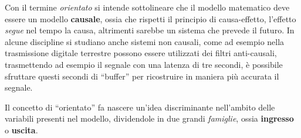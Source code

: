Con il termine \textit{orientato} si intende sottolineare che il modello matematico deve essere un
modello \textbf{causale}, ossia che rispetti il principio di causa-effetto, l'effetto
\textit{segue} nel tempo la causa, altrimenti sarebbe un sistema che prevede il futuro. In alcune
discipline si studiano anche sistemi non causali, come ad esempio nella trasmissione digitale
terrestre possono essere utilizzati dei filtri anti-causali, trasmettendo ad esempio il segnale con
una latenza di tre secondi, è possibile sfruttare questi secondi di ``buffer'' per ricostruire in
maniera più accurata il segnale.

Il concetto di ``orientato'' fa nascere un'idea discriminante nell'ambito delle variabili presenti
nel modello, dividendole in due grandi \textit{famiglie}, ossia
\textbf{ingresso} o \textbf{uscita}.

